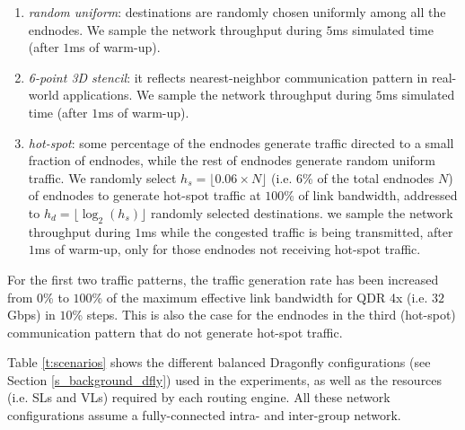\documentclass[review]{elsarticle}
\newcommand{\dfly}{Dragonfly}
\begin{document}
\begin{enumerate}
\item \emph{random uniform}: destinations are randomly chosen uniformly among all the endnodes.
                             We sample the network throughput during $5$ms simulated time (after $1$ms of warm-up).
                             
\item \emph{6-point 3D stencil}: it reflects nearest-neighbor communication pattern in real-world applications.
                       We sample the network throughput during $5$ms simulated time (after $1$ms of warm-up).
                       
\item \emph{hot-spot}: some percentage of the endnodes generate traffic directed to a small fraction of endnodes, while the rest of endnodes generate random uniform traffic.
                       We randomly select $h_s = \lfloor 0.06 \times N \rfloor$ (i.e. 6\% of the total endnodes $N$)
                       of endnodes to generate hot-spot traffic at $100$\% of link bandwidth, addressed to $h_d = \lfloor \log_2(h_s) \rfloor$ randomly selected destinations.
                       we sample the network throughput during $1$ms while the congested traffic is being transmitted, after  $1$ms of warm-up,
                       only for those endnodes not receiving hot-spot traffic.
\end{enumerate}

For the first two traffic patterns, the traffic generation rate has been increased from $0$\% to $100$\% of the maximum effective link bandwidth for QDR 4x (i.e. $32$Gbps) in $10$\% steps.
This is also the case for the endnodes in the third (hot-spot) communication pattern that do not generate hot-spot traffic.

Table \ref{t:scenarios} shows the different balanced \dfly{} configurations (see Section \ref{s_background_dfly}) used in the experiments,
as well as the resources (i.e. SLs and VLs) required by each routing engine.
All these network configurations assume a fully-connected intra- and inter-group network.
\end{document}
